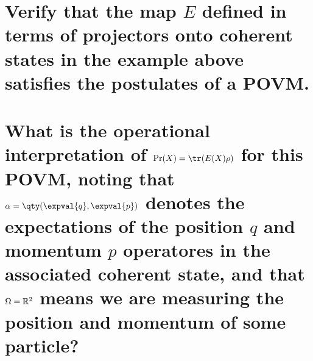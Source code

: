 \documentclass[
	pages,
	boxes,
	color=RoyalPurple
]{homework}
\makeatletter
\numberwithin{tcb@cnt@prob}{section}
\makeatother
\begin{document}
\begin{problem}
\begin{parts}
    \part{Verify that the map $E$ defined in terms of projectors onto coherent states in the example above satisfies the postulates of a \ac{POVM}.}\label{part:33a}
    \part{What is the operational interpretation of $\Pr(X) = \tr(E(X)\rho)$ for this \ac{POVM}, noting that $\alpha = \qty(\expval{q}, \expval{p})$ denotes the expectations of the position $q$ and momentum $p$ operatores in the associated coherent state, and that $\Omega = \mathbb{R}^2$ means we are measuring the position and momentum of some particle?}\label{part:33b}
\end{parts}
\end{problem}
\end{document}
